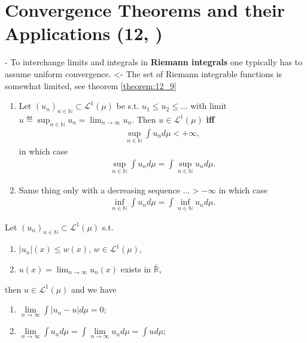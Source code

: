 \section{Convergence Theorems and their Applications \tiny{(12, \cite{schilling2017measures})}}
- To interchange limits and integrals in \textbf{Riemann integrals} one typically has to assume uniform convergence. <- The set of Riemann
integrable functions is somewhat limited, see theorem \ref{theorem:12_9}

\begin{theorem}
    \quad
    
    \begin{enumerate}[label=(\roman*)]
        \item Let \((u_n)_{n\in\mathbb{N}}\subset \mathcal{L}^{1}(\mu)\) be s.t. \(u_1\leq u_2 \leq ...\) with limit 
        \(u\eqdef \sup_{n\in\mathbb{N}}u_n = \lim_{n\rightarrow\infty} u_n\). Then \(u\in\mathcal{L}^{1}(\mu)\) \textbf{iff} 
        \begin{align*}
            \sup\limits_{n\in\mathbb{N}}\int u_nd\mu <+\infty,
        \end{align*}
        in which case
        \begin{align*}
            \sup\limits_{n\in\mathbb{N}}\int u_n d\mu = \int\sup\limits_{n\in\mathbb{N}}u_n d\mu.
        \end{align*}
        \item Same thing only with a decreasing sequence ...\(>-\infty\) in which case
        \begin{align*}
            \inf\limits_{n\in\mathbb{N}}\int u_n d\mu = \int\inf\limits_{n\in\mathbb{N}}u_n d\mu.
        \end{align*}
    \end{enumerate}
\end{theorem}

\begin{theorem}
    Let \((u_n)_{n\in\mathbb{N}}\subset\mathcal{L}^{1}(\mu)\) s.t.
    \begin{enumerate}[label=(\alph*)]
        \item \(|u_n|(x)\leq w(x)\), \(w\in\mathcal{L}^{1}(\mu)\),
        \item \(u(x) = \lim_{n\rightarrow\infty}u_n(x)\) exists in \(\bar{\mathbb{R}}\),
    \end{enumerate}
    then \(u\in\mathcal{L}^{1}(\mu)\) and we have
    \begin{enumerate}[label=(\roman*)]
        \item \(\lim\limits_{n\rightarrow\infty} \int \vert u_n - u\vert d\mu = 0\);
        \item \(\lim\limits_{n\rightarrow\infty} \int u_n d\mu = \int\lim\limits_{n\rightarrow\infty}u_n d\mu = \int ud\mu\);
    \end{enumerate}
\end{theorem}
\ifdetailed
